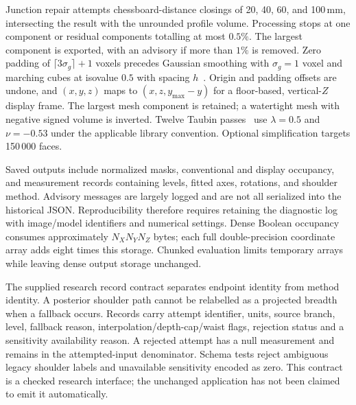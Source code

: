 \documentclass[11pt,a4paper]{article}
\begin{document}
Junction repair attempts chessboard-distance closings of 20, 40, 60, and 100\,mm, intersecting the result with the unrounded profile volume. Processing stops at one component or residual components totalling at most $0.5\%$. The largest component is exported, with an advisory if more than $1\%$ is removed. Zero padding of $\lceil3\sigma_g\rceil+1$ voxels precedes Gaussian smoothing with $\sigma_g=1$ voxel and marching cubes at isovalue $0.5$ with spacing $h$~\cite{lorensen1987marching}. Origin and padding offsets are undone, and $(x,y,z)$ maps to $(x,z,y_{\max}-y)$ for a floor-based, vertical-$Z$ display frame. The largest mesh component is retained; a watertight mesh with negative signed volume is inverted. Twelve Taubin passes~\cite{taubin1995signal} use $\lambda=0.5$ and $\nu=-0.53$ under the applicable library convention. Optional simplification targets 150\,000 faces.

Saved outputs include normalized masks, conventional and display occupancy, and measurement records containing levels, fitted axes, rotations, and shoulder method. Advisory messages are largely logged and are not all serialized into the historical JSON. Reproducibility therefore requires retaining the diagnostic log with image/model identifiers and numerical settings. Dense Boolean occupancy consumes approximately $N_XN_YN_Z$ bytes; each full double-precision coordinate array adds eight times this storage. Chunked evaluation limits temporary arrays while leaving dense output storage unchanged.

The supplied research record contract separates endpoint identity from method identity. A posterior shoulder path cannot be relabelled as a projected breadth when a fallback occurs. Records carry attempt identifier, units, source branch, level, fallback reason, interpolation/depth-cap/waist flags, rejection status and a sensitivity availability reason. A rejected attempt has a null measurement and remains in the attempted-input denominator. Schema tests reject ambiguous legacy shoulder labels and unavailable sensitivity encoded as zero. This contract is a checked research interface; the unchanged application has not been claimed to emit it automatically.
\end{document}
